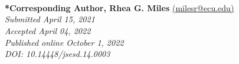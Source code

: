 \documentclass[11pt]{sig-alternate}
\begin{document}


\\ \\ \\
\textbf{*Corresponding Author, Rhea G. Miles} \href{mailto:milesr@ecu.edu}{(milesr@ecu.edu)} \\
\textit{Submitted April 15, 2021 }\\
\textit{Accepted April 04, 2022} \\
\textit{Published online October 1, 2022} \\
\textit{DOI: 10.14448/jsesd.14.0003} \\


\pagebreak
\pagebreak

\vspace{5mm}
\section*{\vspace{140mm}}
\end{document}
